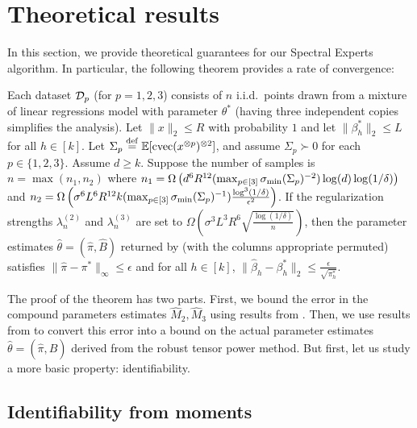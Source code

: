 \section{Theoretical results}
\label{sec:theory}

In this section, we provide theoretical guarantees for our Spectral Experts algorithm.
In particular, the following theorem provides a rate of convergence:

\begin{theorem}
\label{thm:convergence}
Each dataset $\mathcal{D}_p$ (for $p = 1, 2, 3$) consists of $n$ i.i.d.\ points drawn from a mixture
of linear regressions model with parameter $\theta^*$
(having three independent copies simplifies the analysis).
Let $\|x\|_2 \le R$ with probability $1$
and let $\|\beta_h^*\|_2 \le L$ for all $h \in [k]$.
Let $\Sigma_p \stackrel{\rm def}{=} \operatorname{\mathbb{E}}[\operatorname{cvec}(x^{\otimes p})^{\otimes 2}]$, 
and assume $\Sigma_p \succ 0$ for each $p \in \{1,2,3\}$.
Assume $d \ge k$.
Suppose the number of samples is
$n = \max(n_1,n_2)$
where $n_1 = \Omega\left(d^6 R^{12} (\max_{p \in [3]} \sigma_\text{\rm min}(\Sigma_p)^{-2}) \log(d) \log(1/\delta)\right)$ and
$n_2 = \Omega\left( \sigma^6 L^6 R^{12} k (\max_{p \in [3]} \sigma_\text{\rm min}(\Sigma_p)^{-1}) \frac{\log^3 (1/\delta)}{\epsilon^2} \right)$.
If the regularization strengths $\lambda_n^{(2)}$ and $\lambda_n^{(3)}$ are
set to $\Omega\left(\sigma^3 L^3 R^6 \sqrt{\frac{\log(1/\delta)}{n}}\right)$,
then the parameter estimates $\hat\theta = (\hat\pi, \hat B)$ returned by
 (with the columns appropriate permuted)
satisfies 
$\|\hat\pi - \pi^*\|_{\infty} \le \epsilon$
and for all $h \in [k]$,
$\|\hat\beta_h - \beta^*_h\|_2 \le \frac{\epsilon}{\sqrt{\pi_h^*}}$.
\end{theorem}

The proof of the theorem has two parts.
First, we bound the error in the compound parameters estimates $\hat M_2,\hat M_3$
using results from \citet{Tomioka2011}.
Then, we use results from \cite{AnandkumarGeHsu2012} to convert this error
into a bound on the actual parameter estimates $\hat\theta = (\hat\pi, \hat B)$
derived from the robust tensor power method.
But first, let us study a more basic property: identifiability.


\subsection{Identifiability from moments}

